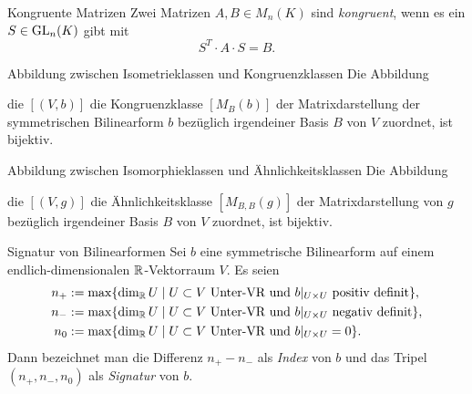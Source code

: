 \documentclass[main.tex]{subfiles}
\begin{document}
\begin{karte}{Kongruente Matrizen}
    Zwei Matrizen \( A,B\in M_n(K) \) sind 
    \textit{kongruent}, wenn es ein \( S\in \operatorname{GL}_n(K) \) 
    gibt mit 
    \[ S^T \cdot A \cdot S = B. \]
\end{karte}

\begin{karte}{Abbildung zwischen Isometrieklassen und Kongruenzklassen}
    Die Abbildung 
    \begin{center}
    \end{center}
    die \( [(V,b)] \) die Kongruenzklasse \( [M_B(b)] \) 
    der Matrixdarstellung der symmetrischen Bilinearform \(b\) 
    bezüglich irgendeiner Basis \(B\) von \(V\) zuordnet, 
    ist bijektiv.
\end{karte}

\begin{karte}{Abbildung zwischen Isomorphieklassen und Ähnlichkeitsklassen}
    Die Abbildung 
    \begin{center}
    \end{center}
    die \( [(V,g)] \) die Ähnlichkeitsklasse \( [M_{B,B}(g)] \) 
    der Matrixdarstellung von \(g\) bezüglich irgendeiner 
    Basis \(B\) von \(V\) zuordnet, ist bijektiv.
\end{karte}

\begin{karte}{Signatur von Bilinearformen}
    Sei \(b\) eine symmetrische Bilinearform auf 
    einem endlich-dimensionalen \(\mathbb{R}\)-Vektorraum \(V\). 
    Es seien 
    \begin{align*}
        n_+ &:= \max\{ \dim_{\mathbb{R}} U \;\vert\; U \subset V \text{ Unter-VR und } b\vert_{U\times U} \text{ positiv definit} \}, \\
        n_- &:= \max\{ \dim_{\mathbb{R}} U \;\vert\; U \subset V \text{ Unter-VR und } b\vert_{U\times U} \text{ negativ definit} \}, \\
        n_0 &:= \max\{ \dim_{\mathbb{R}} U \;\vert\; U \subset V \text{ Unter-VR und } b\vert_{U\times U} = 0 \}.
    \end{align*}
    Dann bezeichnet man die Differenz \( n_+ - n_- \) 
    als \textit{Index} von \(b\) und das Tripel \( (n_+, n_-, n_0) \)
    als \textit{Signatur} von \(b\).
\end{karte}
\end{document}

